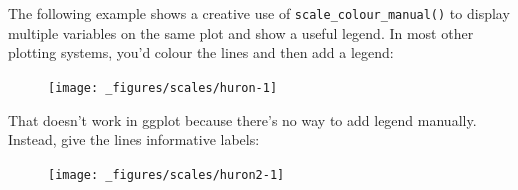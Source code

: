 The following example shows a creative use of
\texttt{scale\_colour\_manual()} to display multiple variables on the
same plot and show a useful legend. In most other plotting systems,
you'd colour the lines and then add a legend: 

\begin{Shaded}
\begin{Highlighting}[]
\StringTok{ }\NormalTok{(} \NormalTok{:}\NormalTok{, } 
\StringTok{  }\NormalTok{(}\NormalTok{(} \StringTok{ }\NormalTok{), } \NormalTok{) +}
\StringTok{  }\NormalTok{(}\NormalTok{(} \StringTok{ }\NormalTok{), } \NormalTok{) }
\end{Highlighting}
\end{Shaded}

\begin{figure}[H]
  \centering
  \texttt{[image: \_figures/scales/huron-1]}
\end{figure}

That doesn't work in ggplot because there's no way to add legend
manually. Instead, give the lines informative labels:

\begin{Shaded}
\begin{Highlighting}[]
\StringTok{  }\NormalTok{(}\NormalTok{(} \StringTok{ }\NormalTok{, } \NormalTok{)) +}
\StringTok{  }\NormalTok{(}\NormalTok{(} \StringTok{ }\NormalTok{, } \NormalTok{)) }
\end{Highlighting}
\end{Shaded}

\begin{figure}[H]
  \centering
  \texttt{[image: \_figures/scales/huron2-1]}
\end{figure}

